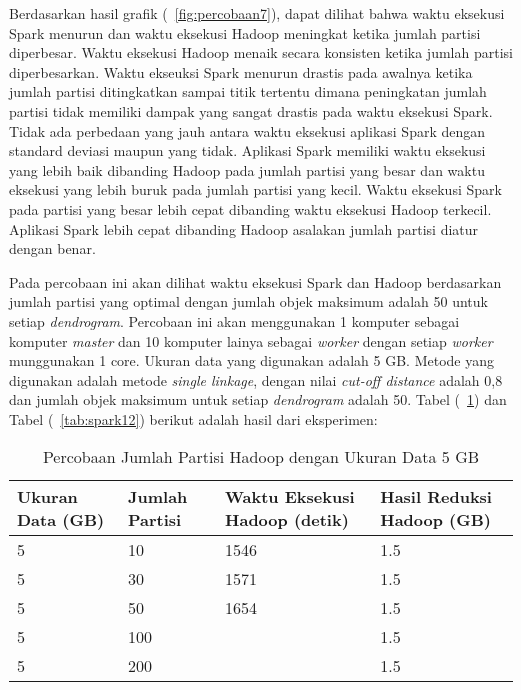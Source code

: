 Berdasarkan hasil grafik (~\ref{fig:percobaan7}), dapat dilihat bahwa waktu eksekusi Spark menurun dan waktu eksekusi Hadoop meningkat ketika jumlah partisi diperbesar. Waktu eksekusi Hadoop menaik secara konsisten ketika jumlah partisi diperbesarkan. Waktu ekseuksi Spark menurun drastis pada awalnya ketika jumlah partisi ditingkatkan sampai titik tertentu dimana peningkatan jumlah partisi tidak memiliki dampak yang sangat drastis pada waktu eksekusi Spark. Tidak ada perbedaan yang jauh antara waktu eksekusi aplikasi Spark dengan standard deviasi maupun yang tidak. Aplikasi Spark memiliki waktu eksekusi yang lebih baik dibanding Hadoop pada jumlah partisi yang besar dan waktu eksekusi yang lebih buruk pada jumlah partisi yang kecil. Waktu eksekusi Spark pada partisi yang besar lebih cepat dibanding waktu eksekusi Hadoop terkecil. Aplikasi Spark lebih cepat dibanding Hadoop asalakan jumlah partisi diatur dengan benar.







Pada percobaan ini akan dilihat waktu eksekusi Spark dan Hadoop berdasarkan jumlah partisi yang optimal dengan jumlah objek maksimum adalah 50 untuk setiap \textit{dendrogram}. Percobaan ini akan menggunakan 1 komputer sebagai komputer \textit{master} dan 10 komputer lainya sebagai \textit{worker} dengan setiap \textit{worker} munggunakan 1 core. Ukuran data yang digunakan adalah 5 GB. Metode yang digunakan adalah metode \textit{single linkage}, dengan nilai \textit{cut-off distance} adalah 0,8 dan jumlah objek maksimum untuk setiap \textit{dendrogram} adalah 50. Tabel (~\ref{tab:spark11}) dan Tabel (~\ref{tab:spark12}) berikut adalah hasil dari eksperimen:





\begin{table}[H] 
	\centering 
	\caption{Percobaan Jumlah Partisi Hadoop dengan Ukuran Data 5 GB}
	\label{tab:spark11}
	\begin{tabular}{|p{3cm}|p{3cm}|p{4cm}|p{4cm}|}
\hline
Ukuran Data (GB) & Jumlah Partisi &  Waktu Eksekusi Hadoop (detik) & Hasil Reduksi Hadoop (GB)\\
\hline
5 & 10 & 1546  & 1.5  \\
\hline
5 & 30 & 1571  & 1.5  \\
\hline
5 & 50 & 1654  & 1.5   \\
\hline
5 & 100 &   & 1.5   \\
\hline
5 & 200 &   & 1.5   \\
\hline


\hline

	\end{tabular} 
\end{table}






